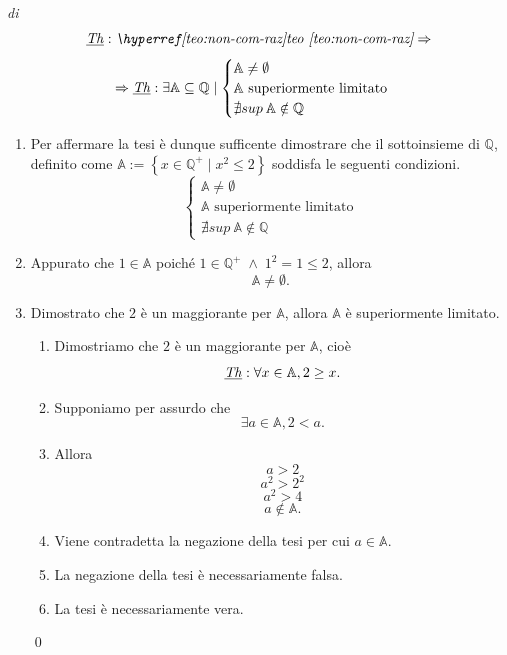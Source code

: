 \begin{enumerate}
    \begin{demonstration}
        \textit{di} 
        \[ \Th  \teoref{teo:non-com-raz} \Rightarrow\]
        \[ \Rightarrow \underbar{\textit{Th}}: 
            \exists \mathbb{A} \subseteq \mathbb{Q} \mid
            \begin{cases}
                \mathbb{A}\neq\emptyset \\
                \mathbb{A} \text{ superiormente limitato}\\
                \nexists sup\:\mathbb{A} \notin \mathbb{Q} 
            \end{cases}    
        \]
        \begin{enumerate}[label=(\roman*)]
            \item Per affermare la tesi è dunque sufficente dimostrare che il
            sottoinsieme di $\mathbb{Q}$, definito come
            $\mathbb{A} := \left\{ x \in \mathbb{Q}^+ \mid x^2 \leq 2 \right\}$ soddisfa le seguenti condizioni.
            \[
                \begin{cases}
                    \mathbb{A}\neq\emptyset \\
                    \mathbb{A} \text{ superiormente limitato}\\
                    \nexists sup\:\mathbb{A} \notin \mathbb{Q} 
                \end{cases}   
            \]
            \item Appurato che $1\in\mathbb{A}$ poiché $1\in\mathbb{Q}^+ \;\land\; 1^2 = 1 \leq 2$, allora
            \[
                \mathbb{A}\neq\emptyset.
            \]
            \item Dimostrato che $2$ è un maggiorante per $\mathbb{A}$,
            allora $\mathbb{A}$ è superiormente limitato.

            \begin{enumerate}[label=\arabic*.]
                \item Dimostriamo che $2$ è un maggiorante per $\mathbb{A}$, cioè
                \[ \underbar{\textit{Th}}: \forall x\in\mathbb{A}, 2 \geq x. \]
                \item Supponiamo per assurdo che
                \[
                    \exists a \in\mathbb{A}, 2 < a.
                \]
                \item Allora
                \[ a > 2 \] \[ a^2 > 2^2 \] \[ a^2 > 4 \] \[ a \notin \mathbb{A}.\]
                \item Viene contradetta la negazione della tesi per cui $a \in \mathbb{A}$.
                \item La negazione della tesi è necessariamente falsa.
                \item La tesi è necessariamente vera.
            \end{enumerate}
            \qed


\end{enumerate}
\end{demonstration}
\end{enumerate}
